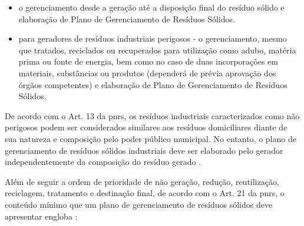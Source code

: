 	\begin{itemize}
		\item o gerenciamento desde a geração até a disposição final do resíduo sólido e elaboração de Plano de Gerenciamento de Resíduos Sólidos.
		\item para geradores de resíduos industriais perigosos - o gerenciamento, mesmo que tratados, reciclados ou recuperados para utilização como adubo, matéria prima ou fonte de energia, bem como no caso de duas incorporações em materiais, substâncias ou produtos (dependerá de prévia aprovação dos órgãos competentes) e elaboração de Plano de Gerenciamento de Resíduos Sólidos.
	\end{itemize}

	De acordo com o Art. 13 da \gls{pnrs}, os resíduos industriais caracterizados como não perigosos podem ser considerados similares aos resíduos domiciliares diante de sua natureza e composição pelo poder público municipal. No entanto, o plano de gerenciamento de resíduos sólidos industriais deve ser elaborado pelo gerador independentemente da composição do resíduo gerado \cite{brasil:12305}.

	Além de seguir a ordem de prioridade de não geração, redução, reutilização, reciclagem, tratamento e destinação final, de acordo com o Art. 21 da \gls{pnrs}, o conteúdo mínimo que um plano de gerenciamento de resíduos sólidos deve apresentar engloba \cite{brasil:12305}:
	

